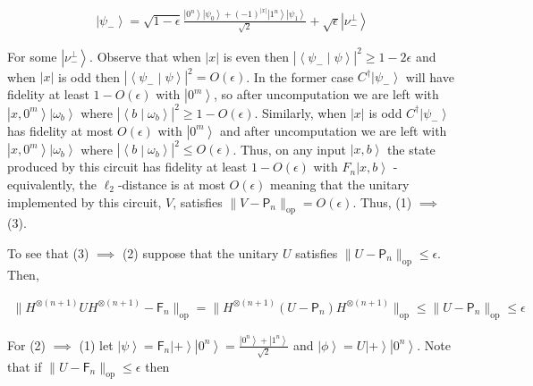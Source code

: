 \[\begin{gathered}
\displaystyle\left|\psi_{-}\right\rangle \displaystyle=\sqrt{1-\epsilon}\frac{\left|0^{n}\right\rangle\left|\psi_{0}\right\rangle+(-1)^{|x|}\left|1^{n}\right\rangle\left|\psi_{1}\right\rangle}{\sqrt{2}}+\sqrt{\epsilon}\left|\nu_{-}^{\perp}\right\rangle
\end{gathered}\]


For some $\left|\nu^{\perp}_{-}\right\rangle$. Observe that when $|x|$ is even then $|\left\langle\psi_{-}\middle|\psi\right\rangle|^{2}\geq 1-2\epsilon$ and when $|x|$ is odd then $|\left\langle\psi_{-}\middle|\psi\right\rangle|^{2}=O(\epsilon)$. In the former case $C^{{\dagger}}\left|\psi_{-}\right\rangle$ will have fidelity at least $1-O(\epsilon)$ with $\left|0^{m}\right\rangle$, so after uncomputation we are left with $\left|x,0^{m}\right\rangle\left|\omega_{b}\right\rangle$ where $|\left\langle b\middle|\omega_{b}\right\rangle|^{2}\geq 1-O(\epsilon)$. Similarly, when $|x|$ is odd $C^{{\dagger}}\left|\psi_{-}\right\rangle$ has fidelity at most $O(\epsilon)$ with $\left|0^{m}\right\rangle$ and after uncomputation we are left with $\left|x,0^{m}\right\rangle\left|\omega_{b}\right\rangle$ where $|\left\langle b\middle|\omega_{b}\right\rangle|^{2}\leq O(\epsilon)$. Thus, on any input $\left|x,b\right\rangle$ the state produced by this circuit has fidelity at least $1-O(\epsilon)$ with $F_{n}\left|x,b\right\rangle$ - equivalently, the $\ell_{2}$-distance is at most $O(\epsilon)$ meaning that the unitary implemented by this circuit, $V$, satisfies $\|V-\mathsf{P}_{n}\|_{\mathrm{op}}=O(\epsilon)$. Thus, (1) $\implies$ (3).\par




To see that (3) $\implies$ (2) suppose that the unitary $U$ satisfies $\|U-\mathsf{P}_{n}\|_{\mathrm{op}}\leq\epsilon$. Then,\par


\[\begin{gathered}
\displaystyle\|H^{\otimes(n+1)}UH^{\otimes(n+1)}-\mathsf{F}_{n}\|_{\mathrm{op}} \displaystyle=\|H^{\otimes(n+1)}(U-\mathsf{P}_{n})H^{\otimes(n+1)}\|_{\mathrm{op}}\leq\|U-\mathsf{P}_{n}\|_{\mathrm{op}}\leq\epsilon
\end{gathered}\]


For (2) $\implies$ (1) let $\left|\psi\right\rangle=\mathsf{F}_{n}\left|+\right\rangle\left|0^{n}\right\rangle=\frac{\left|0^{n}\right\rangle+\left|1^{n}\right\rangle}{\sqrt{2}}$ and $\left|\phi\right\rangle=U\left|+\right\rangle\left|0^{n}\right\rangle$. Note that if $\|U-\mathsf{F}_{n}\|_{\mathrm{op}}\leq\epsilon$ then\par


